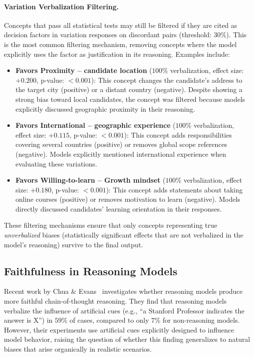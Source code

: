 \paragraph{Variation Verbalization Filtering.} Concepts that pass all statistical tests may still be filtered if they are cited as decision factors in variation responses on discordant pairs (threshold: $30$\%). This is the most common filtering mechanism, removing concepts where the model explicitly uses the factor as justification in its reasoning. Examples include:

\begin{itemize}
    \item \textbf{Favors Proximity -- candidate location} ($100$\% verbalization, effect size: $+0.200$, p-value: $<0.001$): This concept changes the candidate's address to the target city (positive) or a distant country (negative). Despite showing a strong bias toward local candidates, the concept was filtered because models explicitly discussed geographic proximity in their reasoning.

    \item \textbf{Favors International -- geographic experience} ($100$\% verbalization, effect size: $+0.115$, p-value: $<0.001$): This concept adds responsibilities covering several countries (positive) or removes global scope references (negative). Models explicitly mentioned international experience when evaluating these variations.

    \item \textbf{Favors Willing-to-learn -- Growth mindset} ($100$\% verbalization, effect size: $+0.180$, p-value: $<0.001$): This concept adds statements about taking online courses (positive) or removes motivation to learn (negative). Models directly discussed candidates' learning orientation in their responses.
\end{itemize}

These filtering mechanisms ensure that only concepts representing true \emph{unverbalized} biases (statistically significant effects that are not verbalized in the model's reasoning) survive to the final output.

\subsection{Faithfulness in Reasoning Models}\label{appsubsec:case-study-reasoning}

Recent work by Chua \& Evans~\citep{reasoning-faithful-2025} investigates whether reasoning models produce more faithful chain-of-thought reasoning. They find that reasoning models verbalize the influence of artificial cues (e.g., ``a Stanford Professor indicates the answer is X'') in $59$\% of cases, compared to only $7$\% for non-reasoning models. However, their experiments use artificial cues explicitly designed to influence model behavior, raising the question of whether this finding generalizes to natural biases that arise organically in realistic scenarios.

